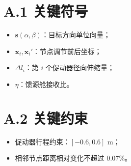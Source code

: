 \section*{A.1 关键符号}
\begin{itemize}
  \item $\mathbf s(\alpha,\beta)$：目标方向单位向量；
  \item $\mathbf x_i,\mathbf x_i'$：节点调节前后坐标；
  \item $\Delta l_i$：第 $i$ 个促动器径向伸缩量；
  \item $\eta$：馈源舱接收比。
\end{itemize}

\section*{A.2 关键约束}
\begin{itemize}
  \item 促动器行程约束：$[-0.6,0.6]$ m；
  \item 相邻节点距离相对变化不超过 $0.07\%$。
\end{itemize}
